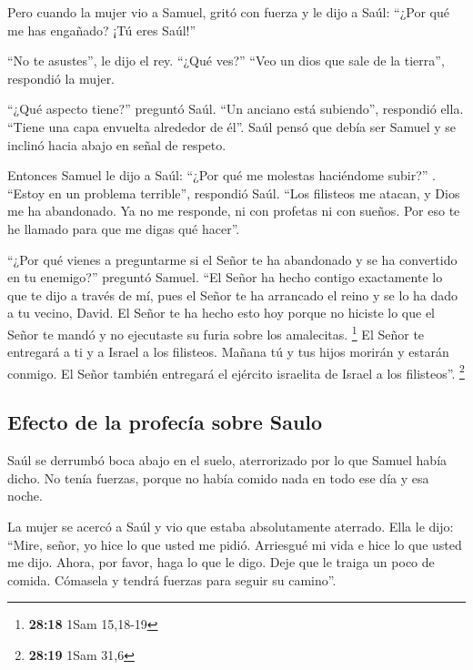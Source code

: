  Pero cuando la mujer vio a Samuel, gritó con fuerza y le
dijo a Saúl: ``¿Por qué me has engañado? ¡Tú eres Saúl!''

 ``No te asustes'', le dijo el rey. ``¿Qué ves?'' ``Veo
un dios que sale de la tierra'', respondió la mujer.

 ``¿Qué aspecto tiene?'' preguntó Saúl. ``Un anciano está
subiendo'', respondió ella. ``Tiene una capa envuelta alrededor de él''.
Saúl pensó que debía ser Samuel y se inclinó hacia abajo en señal de
respeto.

 Entonces Samuel le dijo a Saúl: ``¿Por qué me molestas
haciéndome subir?'' . ``Estoy en un problema terrible'', respondió Saúl.
``Los filisteos me atacan, y Dios me ha abandonado. Ya no me responde,
ni con profetas ni con sueños. Por eso te he llamado para que me digas
qué hacer''.

 ``¿Por qué vienes a preguntarme si el Señor te ha
abandonado y se ha convertido en tu enemigo?'' preguntó Samuel.
 ``El Señor ha hecho contigo exactamente lo que te dijo a
través de mí, pues el Señor te ha arrancado el reino y se lo ha dado a
tu vecino, David.  El Señor te ha hecho esto hoy porque
no hiciste lo que el Señor te mandó y no ejecutaste su furia sobre los
amalecitas. \footnote{\textbf{28:18} 1Sam 15,18-19}  El
Señor te entregará a ti y a Israel a los filisteos. Mañana tú y tus
hijos morirán y estarán conmigo. El Señor también entregará el ejército
israelita de Israel a los filisteos''. \footnote{\textbf{28:19} 1Sam
  31,6}

\hypertarget{efecto-de-la-profecuxeda-sobre-saulo}{%
\subsection{Efecto de la profecía sobre
Saulo}\label{efecto-de-la-profecuxeda-sobre-saulo}}

 Saúl se derrumbó boca abajo en el suelo, aterrorizado
por lo que Samuel había dicho. No tenía fuerzas, porque no había comido
nada en todo ese día y esa noche.

 La mujer se acercó a Saúl y vio que estaba absolutamente
aterrado. Ella le dijo: ``Mire, señor, yo hice lo que usted me pidió.
Arriesgué mi vida e hice lo que usted me dijo.  Ahora,
por favor, haga lo que le digo. Deje que le traiga un poco de comida.
Cómasela y tendrá fuerzas para seguir su camino''.

